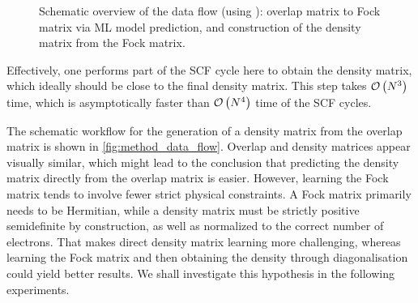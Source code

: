 \begin{figure}[H]
    \caption[Schematic overview data flow]{Schematic overview of the data flow (using ): overlap matrix to Fock matrix via ML model prediction, and construction of the density matrix from the Fock matrix.}
    \label{fig:method_data_flow}
\end{figure}
Effectively, one performs part of the SCF cycle here to obtain the density matrix, which ideally should be close to the final density matrix. This step takes $\mathcal{O}\left(N^3\right)$ time, which is asymptotically faster than $\mathcal{O}\left(N^4\right)$ time of the SCF cycles. 

The schematic workflow for the generation of a density matrix from the overlap matrix is shown in \autoref{fig:method_data_flow}. Overlap and density matrices appear visually similar, which might lead to the conclusion that predicting the density matrix directly from the overlap matrix is easier. However, learning the Fock matrix tends to involve fewer strict physical constraints. A Fock matrix primarily needs to be Hermitian, while a density matrix must be strictly positive semidefinite by construction, as well as normalized to the correct number of electrons. That makes direct density matrix learning more challenging, whereas learning the Fock matrix and then obtaining the density through diagonalisation could yield better results. We shall investigate this hypothesis in the following experiments.\\

